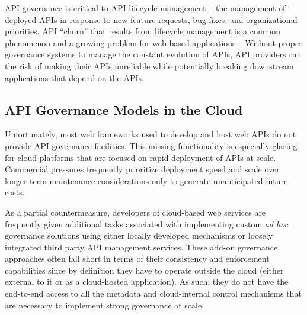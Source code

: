 
API governance is critical to API lifecycle
management --  the management of deployed APIs in response to new feature
requests, bug fixes, and organizational priorities. 
API ``churn'' that results from lifecycle management
is a common phenomenon and a growing
problem for web-based applications~\cite{XXX}.
Without proper governance systems to manage the constant evolution of APIs,
API providers run the risk of making their APIs unreliable while potentially
breaking downstream applications that depend on the APIs.

\subsection{API Governance Models in the Cloud}

Unfortunately, most web frameworks used to develop and host web APIs do not 
provide API governance facilities. This missing functionality is
especially glaring
for cloud platforms that are focused on rapid
deployment of APIs at scale.   Commercial pressures frequently prioritize
deployment speed and scale over longer-term maintenance considerations only to
generate unanticipated future costs.

As a partial countermeasure, developers of cloud-based web services are 
frequently given
additional tasks associated with 
implementing custom {\em ad hoc} governance solutions using either locally
developed mechanisms or loosely integrated
third party API management services. 
These add-on governance
approaches often fall short in terms of their consistency and enforcement
capabilities since
by definition they have to operate outside the
cloud (either external to it or as a cloud-hosted application). 
As such, they do not have the end-to-end 
access to all the metadata and cloud-internal control mechanisms
that are necessary to implement strong governance at scale. 


